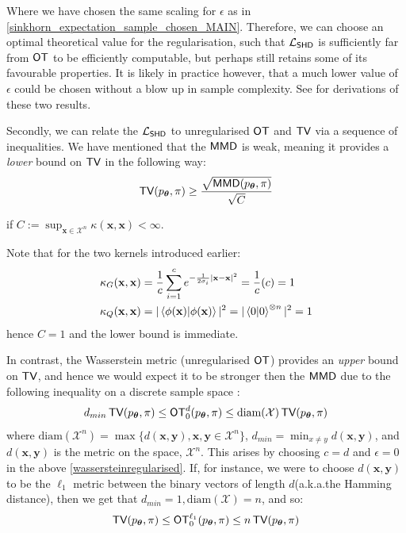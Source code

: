 \noindent Where we have chosen the same scaling for $\epsilon$ as in \eqref{sinkhorn_expectation_sample_chosen_MAIN}. Therefore, we can choose an optimal theoretical value for the regularisation, such that $\mathcal{L}_{\operatorname{\textsf{SHD}}}$ is sufficiently far from $\operatorname{\textsf{OT}}$ to be efficiently computable, but perhaps still retains some of its favourable properties. It is likely in practice however, that a much lower value of $\epsilon$ could be chosen without a blow up in sample complexity\cite{genevay_learning_2017,  genevay_sample_2018}. See  for derivations of these two results.

Secondly, we can relate the $\mathcal{L}_{\operatorname{\textsf{SHD}}}$ to unregularised $\operatorname{\textsf{OT}}$ and $\operatorname{\textsf{TV}}$ via a sequence of inequalities. We have mentioned that the $\operatorname{\textsf{MMD}}$ is weak, meaning it provides a \textit{lower} bound on $\operatorname{\textsf{TV}}$ in the following way\cite{sriperumbudur_integral_2009}:
\begin{align}
    \operatorname{\textsf{TV}}(p_{\boldsymbol\theta}, \pi) \geq \frac{\sqrt{\operatorname{\textsf{MMD}}(p_{\boldsymbol\theta}, \pi)}}{\sqrt{C}}
\end{align}


\noindent if $C := \sup_{\mathbf{x} \in \mathcal{X}^n} \kappa(\mathbf{x}, \mathbf{x}) < \infty$. 

Note that for the two kernels introduced earlier:
\begin{align}
\kappa_G(\mathbf{x}, \mathbf{x}) &= \frac{1}{c}\sum\limits_{i=1}^c e^{-\frac{1}{2\sigma_i}|\mathbf{x} - \mathbf{x}|^2} =\frac{1}{c}(c) = 1\\
\kappa_Q(\mathbf{x}, \mathbf{x}) &= |\braket{\phi(\mathbf{x})|\phi(\mathbf{x})}|^2 = |\braket{0|0}^{\otimes n}|^2 = 1 %
\end{align}
hence $C = 1$ and the lower bound is immediate. 

In contrast, the Wasserstein metric (unregularised $\operatorname{\textsf{OT}}$) provides an \textit{upper} bound on $\operatorname{\textsf{TV}}$, and hence we would expect it to be stronger then the $\operatorname{\textsf{MMD}}$ due to the following inequality on a discrete sample space \cite{gibbs_choosing_2002}:
\begin{align}
    d_{min} \operatorname{\textsf{TV}}(p_{\boldsymbol\theta}, \pi) \leq \operatorname{\textsf{OT}}^d_0(p_{\boldsymbol\theta}, \pi) \leq \text{diam}(\mathcal{X})\operatorname{\textsf{TV}}(p_{\boldsymbol\theta}, \pi) \label{tv_wasserstein_inequality}
\end{align}
where $\text{diam}(\mathcal{X}^n) = \max\{d(\mathbf{x}, \mathbf{y}), \mathbf{x}, \mathbf{y} \in \mathcal{X}^n\}$, $ d_{min} = \min_{x\neq y}d(\mathbf{x}, \mathbf{y})$, and $d(\mathbf{x}, \mathbf{y})$ is the metric on the space, $\mathcal{X}^n$. This arises by choosing $c = d$ and $\epsilon = 0$ in the above \eqref{wassersteinregularised}. If, for instance, we were to choose $d(\mathbf{x}, \mathbf{y})$ to be the $\ell_1$ metric between the binary vectors of length $d$(a.k.a.\@ the  Hamming distance), then we get that $ d_{min} = 1, \text{diam}(\mathcal{X}) = n$, and so:
\begin{align}
     \operatorname{\textsf{TV}}(p_{\boldsymbol\theta}, \pi) \leq \operatorname{\textsf{OT}}^{\ell_1}_0(p_{\boldsymbol\theta}, \pi) \leq n \operatorname{\textsf{TV}}(p_{\boldsymbol\theta}, \pi)
\end{align}

